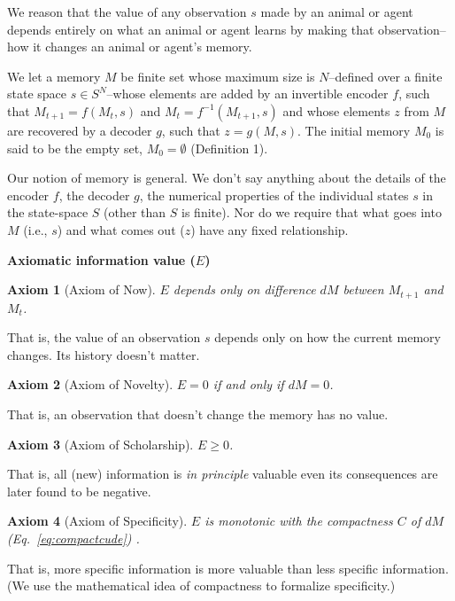 \documentclass[10pt,letterpaper]{article}
\newtheorem{axiom}{Axiom}
\begin{document}
We reason that the value of any observation $s$ made by an animal or agent depends entirely on what an animal or agent learns by making that observation--how it changes an animal or agent's memory. 

We let a memory $M$ be finite set whose maximum size is $N$--defined over a finite state space $s \in S^N$--whose elements are added by an invertible encoder $f$, such that $M_{t+1} = f(M_{t}, s)$ and $M_{t} = f^{-1}(M_{t+1}, s)$ and whose elements $z$ from $M$ are recovered by a decoder $g$, such that $z = g(M, s)$. The initial memory $M_{0}$ is said to be the empty set, $M_{0} = \emptyset$ (Definition 1).
 
Our notion of memory is general. We don't say anything about the details of the encoder $f$, the decoder $g$, the numerical properties of the individual states $s$ in the state-space $S$ (other than $S$ is finite). Nor do we require that what goes into $M$ (i.e., $s$) and what comes out ($z$) have any fixed relationship.

\begin{center} \textbf{Axiomatic information value ($E$)} \end{center}

\begin{axiom}[Axiom of Now]
    $E$ depends only on difference $dM$ between $M_{t+1}$ and $M_{t}$.
    \label{ax:1}
\end{axiom} 
\noindent
That is, the value of an observation $s$ depends only on how the current memory changes. Its history doesn't matter.

\begin{axiom}[Axiom of Novelty]
    $E = 0$ if and only if $dM = 0$. 
    \label{ax:3}
\end{axiom}
\noindent
That is, an observation that doesn't change the memory has no value.

\begin{axiom}[Axiom of Scholarship]
    $E \geq 0$.
    \label{ax:3}
\end{axiom}
\noindent
That is, all (new) information is \textit{in principle} valuable even its consequences are later found to be negative.

\begin{axiom}[Axiom of Specificity]
    $E$ is monotonic with the compactness $C$ of $dM$ (Eq.~\ref{eq:compactcude}) .
    \label{ax:5}
\end{axiom}
\noindent
That is, more specific information is more valuable than less specific information. (We use the mathematical idea of compactness to formalize specificity.)
\end{document}
